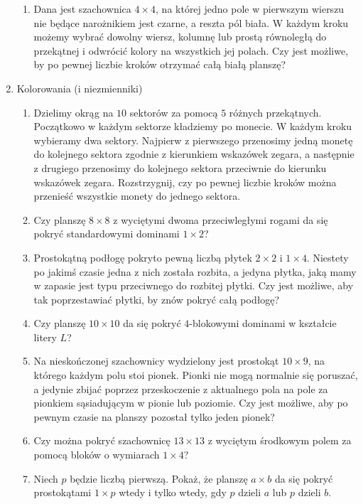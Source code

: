 \documentclass{article}
\begin{document}
\begin{enumerate}
\begin{enumerate}[1.]
				\item Dana jest szachownica $4 \times 4$, na której jedno pole w pierwszym wierszu nie będące narożnikiem jest czarne, a reszta pól biała. W każdym kroku możemy wybrać dowolny wiersz, kolumnę lub prostą równoległą do przekątnej i odwrócić kolory na wszystkich jej polach. Czy jest możliwe, by po pewnej liczbie kroków otrzymać całą białą planszę?
			\end{enumerate}
			\pagebreak
			\item \large{Kolorowania (i niezmienniki)} \normalsize
			
			\begin{enumerate}[1.]
				\item Dzielimy okrąg na $10$ sektorów za pomocą $5$ różnych przekątnych. Początkowo w każdym sektorze kładziemy po monecie. W każdym kroku wybieramy dwa sektory. Najpierw z pierwszego przenosimy jedną monetę do kolejnego sektora zgodnie z kierunkiem wskazówek zegara, a następnie z drugiego przenosimy do kolejnego sektora przeciwnie do kierunku wskazówek zegara. Rozstrzygnij, czy po pewnej liczbie kroków można przenieść wszystkie monety do jednego sektora.
						
				\item Czy planszę $8 \times 8$ z wyciętymi dwoma przeciwległymi rogami da się pokryć standardowymi dominami $1 \times 2$?
				
				\item Prostokątną podłogę pokryto pewną liczbą płytek $2 \times 2$ i $1 \times 4$. Niestety po jakimś czasie jedna z nich została rozbita, a jedyna płytka, jaką mamy w zapasie jest typu przeciwnego do rozbitej płytki. Czy jest możliwe, aby tak poprzestawiać płytki, by znów pokryć całą podłogę?

				\item Czy planszę $10 \times 10$ da się pokryć $4$-blokowymi dominami w kształcie litery $L$?

				\item Na nieskończonej szachownicy wydzielony jest prostokąt $10 \times 9$, na którego każdym polu stoi pionek. Pionki nie mogą normalnie się poruszać, a jedynie zbijać poprzez przeskoczenie z aktualnego pola na pole za pionkiem sąsiadującym w pionie lub poziomie. Czy jest możliwe, aby po pewnym czasie na planszy pozostał tylko jeden pionek?
				
				\item Czy można pokryć szachownicę $13 \times 13$ z wyciętym środkowym polem za pomocą bloków o wymiarach $1 \times 4$?
				
				\item Niech $p$ będzie liczbą pierwszą. Pokaż, że planszę $a \times b$ da się pokryć prostokątami $1 \times p$ wtedy i tylko wtedy, gdy $p$ dzieli $a$ lub $p$ dzieli $b$.

			\end{enumerate}
		\end{enumerate}
\end{document}

